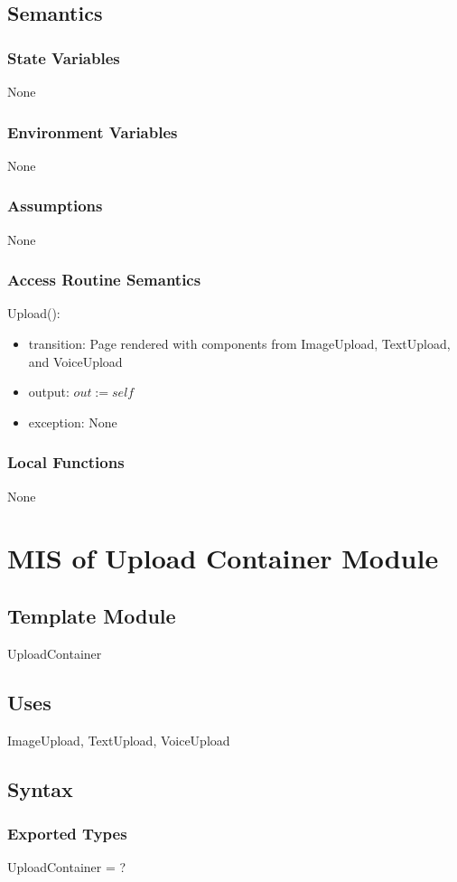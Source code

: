 \documentclass[12pt, titlepage]{article}
\begin{document}
\subsection{Semantics}
\subsubsection{State Variables}
None
\subsubsection{Environment Variables}
None
\subsubsection{Assumptions}
None
\subsubsection{Access Routine Semantics}
\noindent Upload():
\begin{itemize}
	\item transition: Page rendered with components from ImageUpload, 
	TextUpload, and VoiceUpload
	\item output: $out := self$
	\item exception: None
\end{itemize}
\subsubsection{Local Functions}
None

\newpage

\section{MIS of Upload Container Module} \label{UploadContainer}
\subsection{Template Module}
UploadContainer
\subsection{Uses}
ImageUpload, TextUpload, VoiceUpload
\subsection{Syntax}
\subsubsection{Exported Types}
UploadContainer = ?
\end{document}
